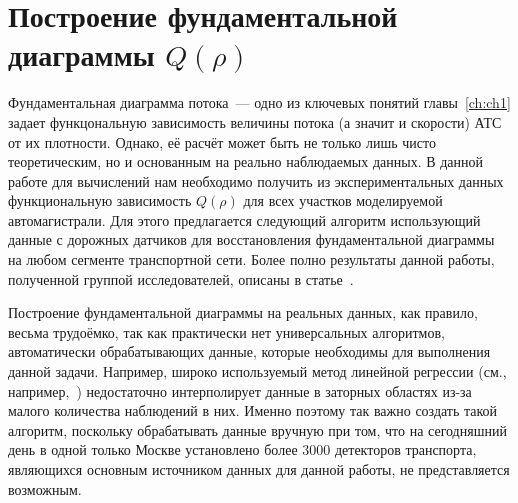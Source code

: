 \chapter{Построение фундаментальной диаграммы \(Q(\rho)\)}\label{ch:ch2}

Фундаментальная диаграмма потока~--- одно из ключевых понятий главы~\ref{ch:ch1} задает функцональную зависимость величины потока (а значит и скорости) АТС от их плотности.
Однако, её расчёт может быть не только лишь чисто теоретическим, но и основанным на реально наблюдаемых данных.
В данной работе для вычислений нам необходимо получить из экспериментальных данных функциональную зависимость \(Q(\rho)\) для всех участков моделируемой автомагистрали.
Для этого предлагается следующий алгоритм использующий данные с дорожных датчиков для восстановления фундаментальной диаграммы на любом сегменте транспортной сети.
Более полно результаты данной работы, полученной группой исследователей, описаны в статье~\cite{collectiveArticle2}.

Построение фундаментальной диаграммы на реальных данных, как правило, весьма трудоёмко, так как практически нет универсальных алгоритмов, автоматически обрабатывающих данные, которые необходимы для выполнения данной задачи. 
Например, широко используемый метод линейной регрессии (см., например,~\cite{wang2011logistic}) недостаточно интерполирует данные в заторных областях из-за малого количества наблюдений в них. 
Именно поэтому так важно создать такой алгоритм, поскольку обрабатывать данные вручную при том, что на сегодняшний день в одной только Москве установлено более 3000 детекторов транспорта, являющихся основным источником данных для данной работы, не представляется возможным.

